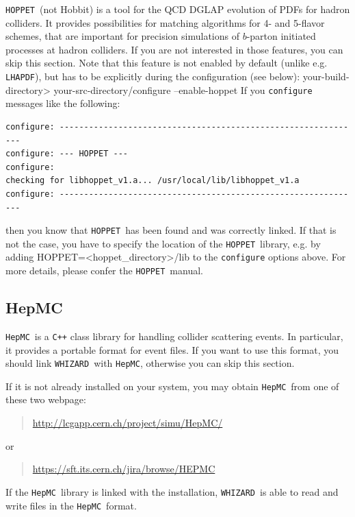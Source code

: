 \documentclass[12pt]{book}
\newenvironment{interaction}%
  {\begingroup\small
   \verbatim}%
  {\endverbatim
   \endgroup\noindent}
\newcommand{\ttt}[1]{\texttt{#1}}
\newcommand{\whizard}{\texttt{WHIZARD}}
\newcommand{\lhapdf}{\texttt{LHAPDF}}
\newcommand{\hepmc}{\texttt{HepMC}}
\newcommand{\hoppet}{\texttt{HOPPET}}
\begin{document}
\hoppet\ (not Hobbit) is a tool for the QCD DGLAP evolution of PDFs
for hadron colliders. It provides possibilities for matching
algorithms for 4- and 5-flavor schemes, that are important for
precision simulations of $b$-parton initiated processes at hadron
colliders. If you are not interested in those features, you can skip
this section. Note that this feature is not enabled by default (unlike
e.g. \lhapdf), but has to be explicitly during the configuration
(see below):
\begin{interaction}
  your-build-directory> your-src-directory/configure --enable-hoppet
\end{interaction}
If you \ttt{configure} messages like the following:
\begin{footnotesize}
\begin{verbatim}
configure: --------------------------------------------------------------
configure: --- HOPPET ---
configure: 
checking for libhoppet_v1.a... /usr/local/lib/libhoppet_v1.a
configure: --------------------------------------------------------------
\end{verbatim}
\end{footnotesize}
then you know that \hoppet\ has been found and was correctly
linked. If that is not the case, you have to specify the location of
the \hoppet\ library, e.g. by adding 
\begin{interaction}
  HOPPET=<hoppet\_directory>/lib
\end{interaction}
to the \ttt{configure} options above. For more details, please confer
the \hoppet\ manual.



\subsection{HepMC}
\label{sec:hepmc}

\hepmc\ is a \ttt{C++} class library for handling collider scattering
events.  In particular, it provides a portable format for event files.
If you want to use this format, you should link \whizard\ with \hepmc,
otherwise you can skip this section.

If it is not already installed on your system, you may obtain
\hepmc\ from one of these two webpage:
\begin{quote}
  \url{http://lcgapp.cern.ch/project/simu/HepMC/}
\end{quote}
or 
\begin{quote}
  \url{https://sft.its.cern.ch/jira/browse/HEPMC}
\end{quote}
If the \hepmc\ library is linked with the installation, \whizard\ is
able to read and write files in the \hepmc\ format.
\end{document}
